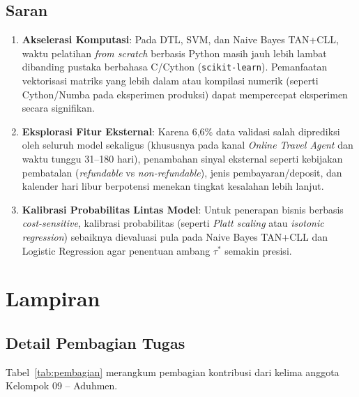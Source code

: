 \documentclass[11pt,a4paper]{article}
\numberwithin{figure}{section}
\numberwithin{table}{section}
\begin{document}
\subsection{Saran}

\begin{enumerate}[leftmargin=1.4cm, itemsep=3pt]
  \item \textbf{Akselerasi Komputasi}: Pada DTL, SVM, dan Naive Bayes TAN+CLL, waktu pelatihan \textit{from scratch} berbasis Python masih jauh lebih lambat dibanding pustaka berbahasa C/Cython (\texttt{scikit-learn}). Pemanfaatan vektorisasi matriks yang lebih dalam atau kompilasi numerik (seperti Cython/Numba pada eksperimen produksi) dapat mempercepat eksperimen secara signifikan.
  \item \textbf{Eksplorasi Fitur Eksternal}: Karena 6,6\% data validasi salah diprediksi oleh seluruh model sekaligus (khususnya pada kanal \textit{Online Travel Agent} dan waktu tunggu 31--180 hari), penambahan sinyal eksternal seperti kebijakan pembatalan (\textit{refundable} vs \textit{non-refundable}), jenis pembayaran/deposit, dan kalender hari libur berpotensi menekan tingkat kesalahan lebih lanjut.
  \item \textbf{Kalibrasi Probabilitas Lintas Model}: Untuk penerapan bisnis berbasis \textit{cost-sensitive}, kalibrasi probabilitas (seperti \textit{Platt scaling} atau \textit{isotonic regression}) sebaiknya dievaluasi pula pada Naive Bayes TAN+CLL dan Logistic Regression agar penentuan ambang $\tau^*$ semakin presisi.
\end{enumerate}

\clearpage
\section{Lampiran}

\subsection{Detail Pembagian Tugas}

Tabel~\ref{tab:pembagian} merangkum pembagian kontribusi dari kelima anggota Kelompok 09 -- Aduhmen.
\end{document}
